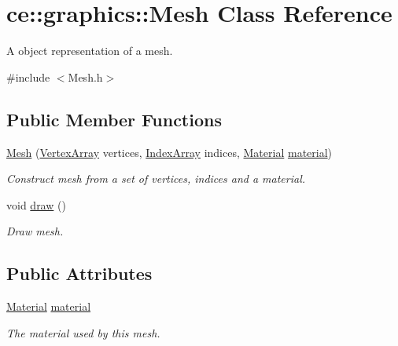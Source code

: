 \hypertarget{classce_1_1graphics_1_1_mesh}{}\section{ce\+:\+:graphics\+:\+:Mesh Class Reference}
\label{classce_1_1graphics_1_1_mesh}


A object representation of a mesh.  




{\ttfamily \#include $<$Mesh.\+h$>$}

\subsection*{Public Member Functions}
\begin{DoxyCompactItemize}
\item 
\mbox{\label{classce_1_1graphics_1_1_mesh_a5069371e754447217960efdf27f89069}} 
\hyperlink{classce_1_1graphics_1_1_mesh_a5069371e754447217960efdf27f89069}{Mesh} (\hyperlink{_vertex_8h_a72d0effc290681342d1fc2b5fffa6aef}{Vertex\+Array} vertices, \hyperlink{_vertex_8h_a25b1e42db1e356e8bfc3ab61ade25040}{Index\+Array} indices, \hyperlink{structce_1_1graphics_1_1_material}{Material} \hyperlink{classce_1_1graphics_1_1_mesh_ae10e3d9449f7af5b17644b94d2d4e396}{material})
\begin{DoxyCompactList}\small\item\em Construct mesh from a set of vertices, indices and a material. \end{DoxyCompactList}\item 
void \hyperlink{classce_1_1graphics_1_1_mesh_a4c056e83554a4face474bbc21d309910}{draw} ()
\begin{DoxyCompactList}\small\item\em Draw mesh. \end{DoxyCompactList}\end{DoxyCompactItemize}
\subsection*{Public Attributes}
\begin{DoxyCompactItemize}
\item 
\mbox{\label{classce_1_1graphics_1_1_mesh_ae10e3d9449f7af5b17644b94d2d4e396}} 
\hyperlink{structce_1_1graphics_1_1_material}{Material} \hyperlink{classce_1_1graphics_1_1_mesh_ae10e3d9449f7af5b17644b94d2d4e396}{material}
\begin{DoxyCompactList}\small\item\em The material used by this mesh. \end{DoxyCompactList}\end{DoxyCompactItemize}

